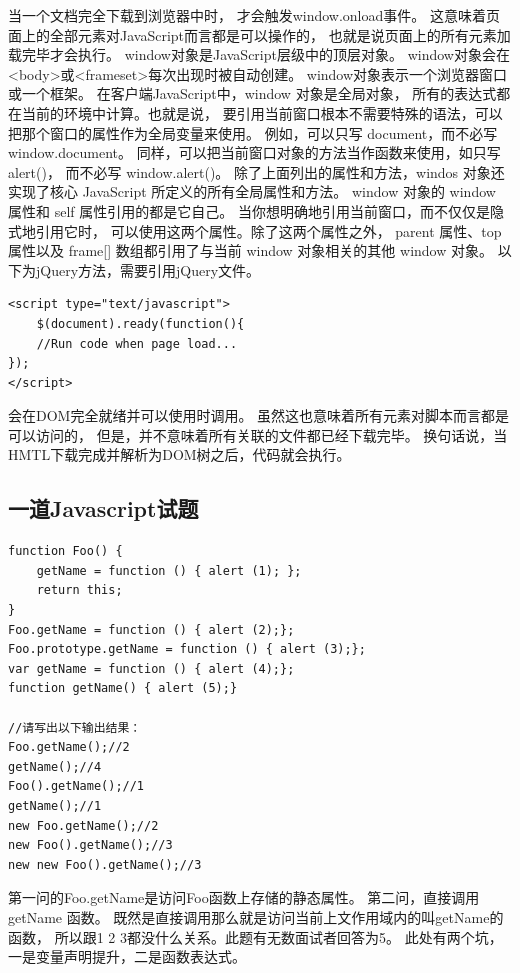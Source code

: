 \documentclass{book}
\begin{document}
当一个文档完全下载到浏览器中时，
才会触发window.onload事件。
这意味着页面上的全部元素对JavaScript而言都是可以操作的，
也就是说页面上的所有元素加载完毕才会执行。
window对象是JavaScript层级中的顶层对象。
window对象会在<body>或<frameset>每次出现时被自动创建。
window对象表示一个浏览器窗口或一个框架。
在客户端JavaScript中，window 对象是全局对象，
所有的表达式都在当前的环境中计算。也就是说，
要引用当前窗口根本不需要特殊的语法，可以把那个窗口的属性作为全局变量来使用。
例如，可以只写 document，而不必写 window.document。
同样，可以把当前窗口对象的方法当作函数来使用，如只写 alert()，
而不必写 window.alert()。
除了上面列出的属性和方法，windos 对象还实现了核心 JavaScript 所定义的所有全局属性和方法。
window 对象的 window 属性和 self 属性引用的都是它自己。
当你想明确地引用当前窗口，而不仅仅是隐式地引用它时，
可以使用这两个属性。除了这两个属性之外，
parent 属性、top 属性以及 frame[] 数组都引用了与当前 window 对象相关的其他 window 对象。
以下为jQuery方法，需要引用jQuery文件。 

\begin{lstlisting}[language=VBSCript]
<script type="text/javascript">
	$(document).ready(function(){ 
	//Run code when page load...
}); 
</script> 
\end{lstlisting}

会在DOM完全就绪并可以使用时调用。
虽然这也意味着所有元素对脚本而言都是可以访问的，
但是，并不意味着所有关联的文件都已经下载完毕。
换句话说，当HMTL下载完成并解析为DOM树之后，代码就会执行。

\subsection{一道Javascript试题}


\begin{lstlisting}[language=VBScript]
function Foo() {
    getName = function () { alert (1); };
    return this;
}
Foo.getName = function () { alert (2);};
Foo.prototype.getName = function () { alert (3);};
var getName = function () { alert (4);};
function getName() { alert (5);}

//请写出以下输出结果：
Foo.getName();//2
getName();//4
Foo().getName();//1
getName();//1
new Foo.getName();//2
new Foo().getName();//3
new new Foo().getName();//3
\end{lstlisting}

第一问的Foo.getName是访问Foo函数上存储的静态属性。
第二问，直接调用 getName 函数。
既然是直接调用那么就是访问当前上文作用域内的叫getName的函数，
所以跟1 2 3都没什么关系。此题有无数面试者回答为5。
此处有两个坑，一是变量声明提升，二是函数表达式。
\end{document}

